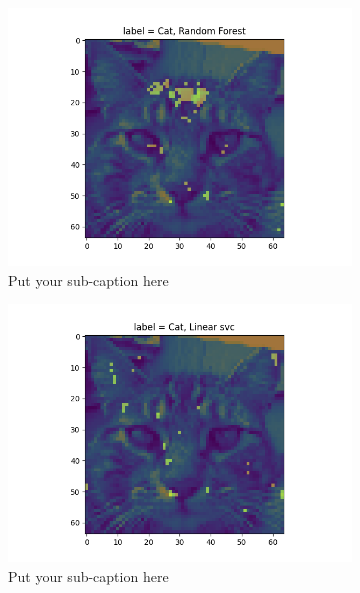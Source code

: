 \documentclass{article}
\begin{document}
\begin{figure}[ht]
\begin{subfigure}{.33\textwidth}
  \centering
  \includegraphics[width=1\linewidth]{1b/Imp_feat RandForest.png}  
  \caption{Put your sub-caption here}
  \label{RandF}
\end{subfigure}
\begin{subfigure}{.33\textwidth}
  \centering
  \includegraphics[width=1\linewidth]{1b/Imp_feat_svc.png}  
  \caption{Put your sub-caption here}
  \label{fig:sub-second}
\end{subfigure}
\begin{subfigure}{.33\textwidth}
  \centering

\end{subfigure}
\end{figure}
\end{document}
